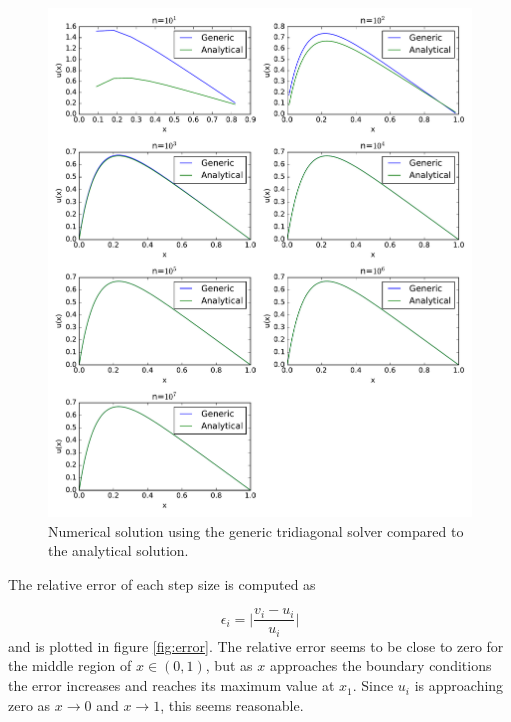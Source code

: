 \documentclass{article}
\begin{document}
\begin{figure}[H]
    \includegraphics[width=\linewidth]{fig/generic_vs_analytical.pdf}
    \caption{Numerical solution using the generic tridiagonal solver compared to the analytical solution.}
    \label{fig:g_vs_a}
\end{figure}

The relative error of each step size is computed as 

\begin{equation}
\epsilon_i = \big|\frac{v_i - u_i}{u_i}\big|
\label{eq:error}
\end{equation}
and is plotted in figure \ref{fig:error}. The relative error seems to be close to zero for the middle region of $x \in (0,1)$, but as $x$ approaches the boundary conditions the error increases and reaches its maximum value at $x_1$. Since $u_i$ is approaching zero as $x \rightarrow 0$ and $x \rightarrow 1$, this seems reasonable. 
\end{document}
